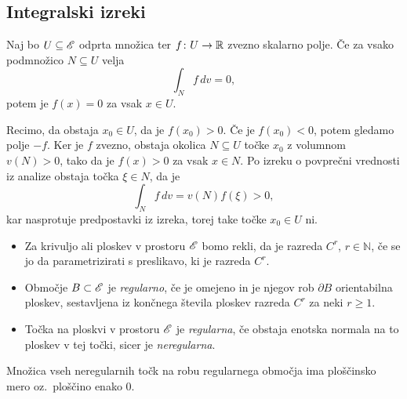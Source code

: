 \subsection{Integralski izreki}


\begin{trditev}\label{t:oiz}
	Naj bo $U\subseteq\mathscr E$ odprta množica ter $f\colon U\to \mathbb R$ zvezno skalarno polje.
	Če za vsako podmnožico $N\subseteq U$ velja
	\[ \int_{N} f\,dv=0, \]
	potem je $f(x)=0$ za vsak $x\in U$.
\end{trditev}
\proof
	Recimo, da obstaja $x_0\in U$, da je $f(x_0)> 0$. Če je $f(x_0)< 0$, potem gledamo polje $-f$.
	Ker je $f$ zvezno, obstaja okolica $N\subseteq U$ točke $x_0$ z volumnom $v(N)>0$, tako da je $f(x)>0$
	za vsak $x\in N$. Po izreku o povprečni vrednosti iz analize obstaja točka $\xi\in N$, da je
	\[ \int_{N}f\,dv=v(N)f(\xi)> 0, \]
	kar nasprotuje predpostavki iz izreka, torej take točke $x_0\in U$ ni.
\endproof

\begin{definicija}
	\begin{itemize}
		\item
		Za krivuljo ali ploskev v prostoru $\mathscr E$ bomo rekli, da je razreda $C^r$, $r\in\mathbb{N}$, če se jo da
		parametrizirati s preslikavo, ki je razreda $C^r$.
		\item
		Območje $B\subset\mathscr E$ je \emph{regularno}, če je omejeno in je njegov rob $\partial B$
		orientabilna ploskev, sestavljena iz končnega števila ploskev razreda $C^r$ za neki $r\geq 1$.
		\item
		Točka na ploskvi v prostoru $\mathscr E$ je \emph{regularna}, če obstaja enotska normala
		na to ploskev v tej točki, sicer je \emph{neregularna}.
	\end{itemize}
\end{definicija}
Množica vseh neregularnih točk na robu regularnega območja ima ploščin\-sko mero oz.~ploščino enako 0.

